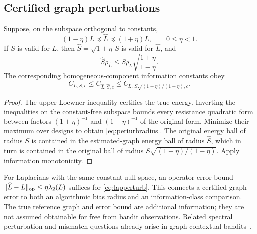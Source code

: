 \subsection{Certified graph perturbations}
\begin{proposition}
Suppose, on the subspace orthogonal to constants,
\begin{equation}
 (1-\eta)L\preceq\widehat L\preceq(1+\eta)L,\qquad 0\le\eta<1.
 \label{eq:lapperturb}
\end{equation}
If $S$ is valid for $L$, then $\widehat S=\sqrt{1+\eta}\,S$ is valid for $\widehat L$, and
\begin{equation}
 \widehat S\rho_{\widehat L}
 \le S\rho_L\sqrt{\frac{1+\eta}{1-\eta}}.
 \label{eq:perturbradius}
\end{equation}
The corresponding homogeneous-component information constants obey
\begin{equation}
 C_{L,S,c}\le C_{\widehat L,\widehat S,c}
 \le C_{L,\,S\sqrt{(1+\eta)/(1-\eta)},c}.
 \label{eq:perturbinfo}
\end{equation}
\label{prop:perturb}
\end{proposition}
\begin{proof}
The upper Loewner inequality certifies the true energy. Inverting the inequalities on the constant-free subspace bounds every resistance quadratic form between factors $(1+\eta)^{-1}$ and $(1-\eta)^{-1}$ of the original form. Minimize their maximum over designs to obtain \eqref{eq:perturbradius}. The original energy ball of radius $S$ is contained in the estimated-graph energy ball of radius $\widehat S$, which in turn is contained in the original ball of radius $S\sqrt{(1+\eta)/(1-\eta)}$. Apply information monotonicity.
\end{proof}
For Laplacians with the same constant null space, an operator error bound
$\|\widehat L-L\|_{\rm op}\le\eta\lambda_2(L)$ suffices for \eqref{eq:lapperturb}. This connects a certified graph error to both an algorithmic bias radius and an information-class comparison. The true reference graph and error bound are additional information; they are not assumed obtainable for free from bandit observations. Related spectral perturbation and mismatch questions already arise in graph-contextual bandits~\cite{mondal2026}.

